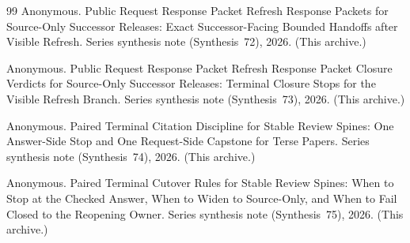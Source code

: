 \documentclass[11pt]{article}
\begin{document}
\begin{thebibliography}{99}
Anonymous.
\newblock Public Request Response Packet Refresh Response Packets for Source-Only Successor Releases: Exact Successor-Facing Bounded Handoffs after Visible Refresh.
\newblock Series synthesis note (Synthesis~72), 2026. (This archive.)

Anonymous.
\newblock Public Request Response Packet Refresh Response Packet Closure Verdicts for Source-Only Successor Releases: Terminal Closure Stops for the Visible Refresh Branch.
\newblock Series synthesis note (Synthesis~73), 2026. (This archive.)

Anonymous.
\newblock Paired Terminal Citation Discipline for Stable Review Spines: One Answer-Side Stop and One Request-Side Capstone for Terse Papers.
\newblock Series synthesis note (Synthesis~74), 2026. (This archive.)

Anonymous.
\newblock Paired Terminal Cutover Rules for Stable Review Spines: When to Stop at the Checked Answer, When to Widen to Source-Only, and When to Fail Closed to the Reopening Owner.
\newblock Series synthesis note (Synthesis~75), 2026. (This archive.)

\end{thebibliography}
\end{document}
